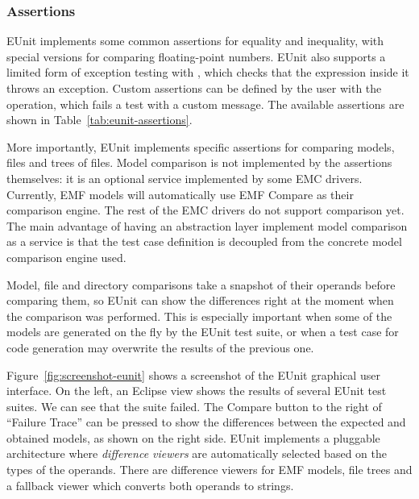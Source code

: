 \subsubsection{Assertions}

EUnit implements some common assertions for equality and inequality, with special versions for comparing floating-point numbers. EUnit also supports a limited form of exception testing with , which checks that the expression inside it throws an exception. Custom assertions can be defined by the user with the  operation, which fails a test with a custom message. The available assertions are shown in Table~\ref{tab:eunit-assertions}.

More importantly, EUnit implements specific assertions for comparing models, files and trees of files. Model comparison is not implemented by the assertions themselves: it is an optional service implemented by some EMC drivers. Currently, EMF models will automatically use EMF Compare as their comparison engine. The rest of the EMC drivers do not support comparison yet.  The main advantage of having an abstraction layer implement model comparison as a service is that the test case definition is decoupled from the concrete model comparison engine used.

Model, file and directory comparisons take a snapshot of their operands before comparing them, so EUnit can show the differences right at the moment when the comparison was performed. This is especially important when some of the models are generated on the fly by the EUnit test suite, or when a test case for code generation may overwrite the results of the previous one.

Figure~\ref{fig:screenshot-eunit} shows a screenshot of the EUnit graphical user interface. On the left, an Eclipse view shows the results of several EUnit test suites. We can see that the  suite failed. The Compare button to the right of ``Failure Trace'' can be pressed to show the differences between the expected and obtained models, as shown on the right side. EUnit implements a pluggable architecture where \emph{difference viewers} are automatically selected based on the types of the operands. There are difference viewers for EMF models, file trees and a fallback viewer which converts both operands to strings.

